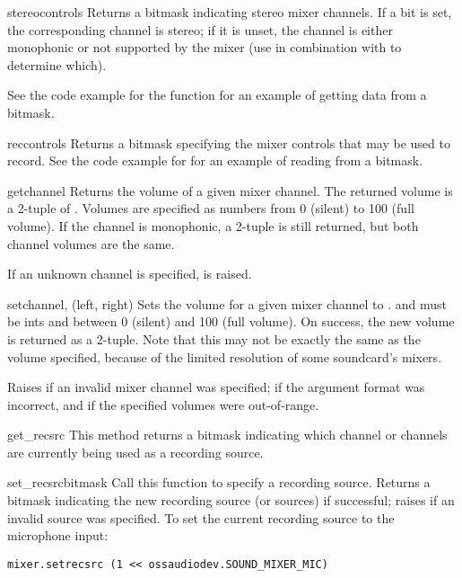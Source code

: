 \begin{methoddesc}{stereocontrols}{}
Returns a bitmask indicating stereo mixer channels.  If a bit is set,
the corresponding channel is stereo; if it is unset, the channel is
either monophonic or not supported by the mixer (use in combination with
 to determine which).

See the code example for the  function for an example
of getting data from a bitmask.
\end{methoddesc}

\begin{methoddesc}{reccontrols}{}
Returns a bitmask specifying the mixer controls that may be used to
record.  See the code example for  for an example of
reading from a bitmask.
\end{methoddesc}

\begin{methoddesc}{get}{channel}
Returns the volume of a given mixer channel.  The returned volume is a
2-tuple of .  Volumes are specified as
numbers from 0 (silent) to 100 (full volume).  If the channel is
monophonic, a 2-tuple is still returned, but both channel volumes are
the same.

If an unknown channel is specified,  is raised.
\end{methoddesc}

\begin{methoddesc}{set}{channel, (left, right)}
Sets the volume for a given mixer channel to .
 and  must be ints and between 0 (silent) and 100
(full volume).  On success, the new volume is returned as a 2-tuple.
Note that this may not be exactly the same as the volume specified,
because of the limited resolution of some soundcard's mixers.

Raises  if an invalid mixer channel was specified;
 if the argument format was incorrect, and
 if the specified volumes were out-of-range.
\end{methoddesc}

\begin{methoddesc}{get_recsrc}{}
This method returns a bitmask indicating which channel or channels are
currently being used as a recording source.
\end{methoddesc}

\begin{methoddesc}{set_recsrc}{bitmask}
Call this function to specify a recording source.  Returns a bitmask
indicating the new recording source (or sources) if successful; raises
 if an invalid source was specified.  To set the current
recording source to the microphone input:

\begin{verbatim}
mixer.setrecsrc (1 << ossaudiodev.SOUND_MIXER_MIC)
\end{verbatim}
\end{methoddesc}



